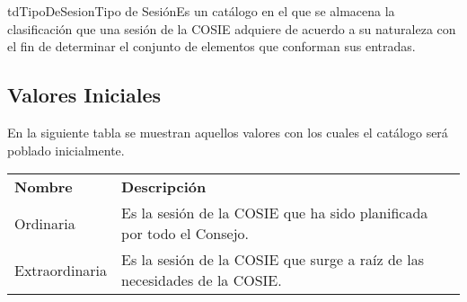 \begin{TipoDeDato}{tdTipoDeSesion}{Tipo de Sesión}{Es un catálogo en el que se almacena la clasificación que una sesión de la COSIE adquiere de acuerdo a su naturaleza con el fin de determinar el conjunto de elementos que conforman sus entradas.}
	
	\begin{tdAtributos}
	\end{tdAtributos}
	
	\subsection{Valores Iniciales}
	En la siguiente tabla se muestran aquellos valores con los cuales el catálogo será poblado inicialmente. \cdtEmpty

		\begin{longtable}{| p{}| p{}|}
	 			\rowcolor{colorPrincipal}
	 			\multicolumn{2}{|c|}{\bf \color{white} Valores Iniciales}\\
	 			\hline
	 			\rowcolor{colorSecundario}
	 			\bf \color{white} Nombre & \bf \color{white} Descripción \\
	 			\hline
	 			Ordinaria & Es la sesión de la COSIE que ha sido planificada por todo el Consejo. \\
	 			\hline
	 			Extraordinaria & Es la sesión de la COSIE que surge a raíz de las necesidades de la COSIE. \\
	 			\hline
	 		\end{longtable}
	\end{TipoDeDato}
	
